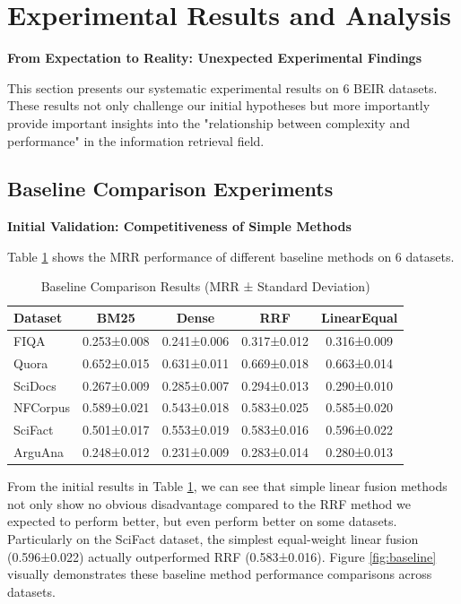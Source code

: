\documentclass[letterpaper]{article} %
\begin{document}
\section{Experimental Results and Analysis}

\textbf{From Expectation to Reality: Unexpected Experimental Findings}

This section presents our systematic experimental results on 6 BEIR datasets. These results not only challenge our initial hypotheses but more importantly provide important insights into the "relationship between complexity and performance" in the information retrieval field.

\subsection{Baseline Comparison Experiments}

\textbf{Initial Validation: Competitiveness of Simple Methods}

Table \ref{tab:baseline} shows the MRR performance of different baseline methods on 6 datasets.

\begin{table}[t]
\centering
\caption{Baseline Comparison Results (MRR ± Standard Deviation)}
\label{tab:baseline}
\begin{tabular}{lcccc}
\toprule
Dataset & BM25 & Dense & RRF & LinearEqual \\
\midrule
FIQA & 0.253±0.008 & 0.241±0.006 & 0.317±0.012 & 0.316±0.009 \\
Quora & 0.652±0.015 & 0.631±0.011 & 0.669±0.018 & 0.663±0.014 \\
SciDocs & 0.267±0.009 & 0.285±0.007 & 0.294±0.013 & 0.290±0.010 \\
NFCorpus & 0.589±0.021 & 0.543±0.018 & 0.583±0.025 & 0.585±0.020 \\
SciFact & 0.501±0.017 & 0.553±0.019 & 0.583±0.016 & 0.596±0.022 \\
ArguAna & 0.248±0.012 & 0.231±0.009 & 0.283±0.014 & 0.280±0.013 \\
\bottomrule
\end{tabular}
\end{table}

From the initial results in Table \ref{tab:baseline}, we can see that simple linear fusion methods not only show no obvious disadvantage compared to the RRF method we expected to perform better, but even perform better on some datasets. Particularly on the SciFact dataset, the simplest equal-weight linear fusion (0.596±0.022) actually outperformed RRF (0.583±0.016). Figure \ref{fig:baseline} visually demonstrates these baseline method performance comparisons across datasets.
\end{document}
